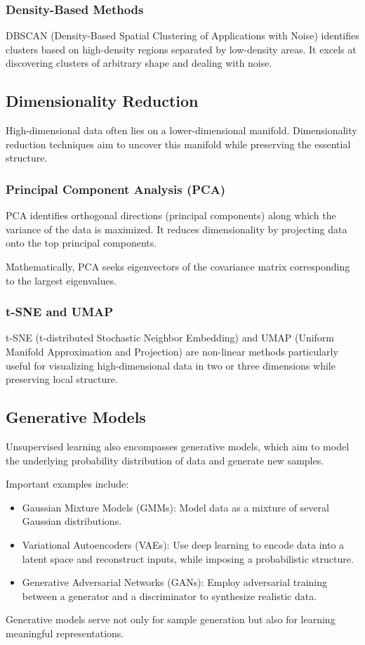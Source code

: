 \documentclass[openany]{book}
\begin{document}
\subsubsection{Density-Based Methods}
DBSCAN (Density-Based Spatial Clustering of Applications with Noise) identifies 
clusters based on high-density regions separated by low-density areas. It 
excels at discovering clusters of arbitrary shape and dealing with noise.

\subsection{Dimensionality Reduction}
High-dimensional data often lies on a lower-dimensional manifold. Dimensionality 
reduction techniques aim to uncover this manifold while preserving the essential 
structure.

\subsubsection{Principal Component Analysis (PCA)}
PCA identifies orthogonal directions (principal components) along which the 
variance of the data is maximized. It reduces dimensionality by projecting data 
onto the top principal components.

Mathematically, PCA seeks eigenvectors of the covariance matrix corresponding to 
the largest eigenvalues.

\subsubsection{t-SNE and UMAP}
t-SNE (t-distributed Stochastic Neighbor Embedding) and UMAP (Uniform Manifold 
Approximation and Projection) are non-linear methods particularly useful for 
visualizing high-dimensional data in two or three dimensions while preserving 
local structure.

\subsection{Generative Models}
Unsupervised learning also encompasses generative models, which aim to model the 
underlying probability distribution of data and generate new samples.

Important examples include:
\begin{itemize}
    \item Gaussian Mixture Models (GMMs): Model data as a mixture of several 
    Gaussian distributions.
    \item Variational Autoencoders (VAEs): Use deep learning to encode data into 
    a latent space and reconstruct inputs, while imposing a probabilistic 
    structure.
    \item Generative Adversarial Networks (GANs): Employ adversarial training 
    between a generator and a discriminator to synthesize realistic data.
\end{itemize}
Generative models serve not only for sample generation but also for learning 
meaningful representations.
\end{document}

